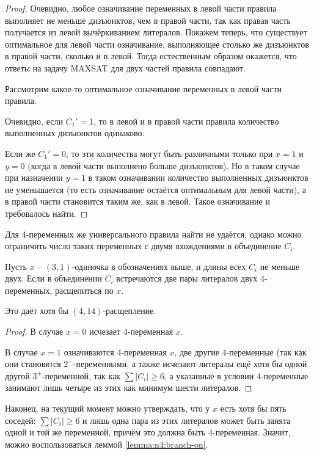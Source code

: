\begin{proof}
 Очевидно, любое означивание переменных в левой части правила выполняет не меньше дизъюнктов, чем в правой части, так как правая часть получается из левой вычёркиванием литералов.
 Покажем теперь, что существует оптимальное для левой части означивание, выполняющее столько же дизъюнктов в правой части, сколько и в левой. Тогда естественным образом окажется, что ответы на задачу MAXSAT для двух частей правила совпадают.

 Рассмотрим какое-то оптимальное означивание переменных в левой части правила.

 Очевидно, если $C_1' = 1$, то в левой и в правой части правила количество выполненных дизъюнктов одинаково.

 Если же $C_1' = 0$, то эти количества могут быть различными только при $x = 1$ и $y = 0$ (когда в левой части выполнено больше дизъюнктов). Но в таком случае при назначении $y = 1$ в таком означивании количество выполненных дизъюнктов не уменьшается (то есть означивание остаётся оптимальным для левой части), а в правой части становится таким же, как в левой.
 Такое означивание и требовалось найти.
\end{proof}

Для 4-переменных же универсального правила найти не удаётся, однако можно ограничить число таких переменных с двумя вхождениями в объединение $C_i$.

\begin{brule}
 Пусть $x$ -- $(3,1)$-одиночка в обозначениях выше, и длины всех $C_i$ не меньше двух. Если в объединении $C_i$ встречаются две пары литералов двух 4-переменных, расщепиться по $x$.

 Это даёт хотя бы $(4,14)$-расщепление.
 \label{brule:n4:31:4v-2}
\end{brule}

\begin{proof}
 В случае $x = 0$ исчезает 4-переменная $x$.

 В случае $x = 1$ означиваются 4-переменная $x$, две другие 4-переменные (так как они становятся $2^-$-переменными, а также исчезают литералы ещё хотя бы одной другой $3^+$-переменной, так как $\sum |C_i| \geq 6$, а указанные в условии 4-переменные занимают лишь четыре из этих как минимум шести литералов.
\end{proof}

Наконец, на текущий момент можно утверждать, что у $x$ есть хотя бы пять соседей: $\sum |C_i| \geq 6$ и лишь одна пара из этих литералов может быть занята одной и той же переменной, причём это должна быть 4-переменная.
Значит, можно воспользоваться леммой \ref{lemma:n4:branch-on}.

